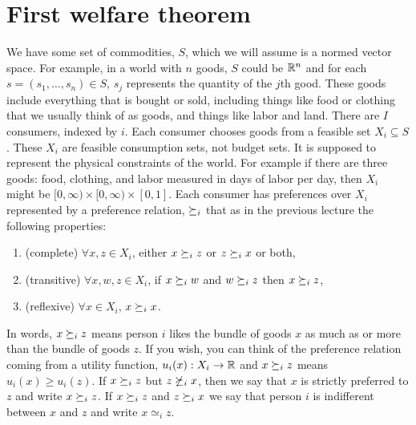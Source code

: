 \section{First welfare theorem}

We have some set of commodities, $S$, which we will assume is a normed
vector space. For example, in a world with $n$ goods, $S$ could be
$\mathbb{R}^n$ and for each $s = (s_1,...,s_n) \in S$, $s_j$ represents the
quantity of the $j$th good. These goods include everything that is
bought or sold, including things like food or clothing that we usually
think of as goods, and things like labor and land. There are $I$
consumers, indexed by $i$. Each consumer chooses goods from a feasible
set $X_i \subseteq S$. These $X_i$ are feasible consumption sets, not
budget sets. It is supposed to represent the physical constraints of
the world. For example if there are three goods: food, clothing, and labor
measured in days of labor per day, then $X_i$ might be $[0, \infty)
\times [0,\infty) \times [0, 1]$.  Each consumer has preferences over
$X_i$ represented by a preference relation, $\succeq_i$ that as in the
previous lecture the following properties:
\begin{enumerate}
\item (complete) $\forall x, z \in X_i$, either $x \succeq_i z$ or $z
  \succeq_i x$ or both,
\item (transitive) $\forall x, w, z \in X_i$, if $x \succeq_i w$ and $w
  \succeq_i z$ then $x \succeq_i z$,
\item (reflexive) $\forall x \in X_i$, $x \succeq_i x$.
\end{enumerate}
In words, $x \succeq_i z$ means person $i$ likes the bundle of goods $x$
as much as or more than the bundle of goods $z$. If you wish, you can
think of the preference relation coming from a utility function,
$u_i(x) : X_i \rightarrow \mathbb{R}$ and $x \succeq_i z$ means $u_i(x) \geq
u_i(z)$.  If $x \succeq_i z$ but $z \not\succeq_i x$, then we say that
$x$ is strictly preferred to $z$ and write $x \succeq_i z$. If $x
\succeq_i z$ and $z \succeq_i x$ we say that person $i$ is indifferent
between $x$ and $z$ and write $x \simeq_i z$.


